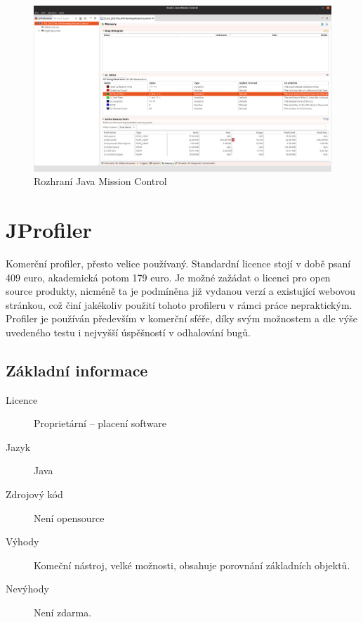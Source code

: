 \begin{figure}[ht!]
	\centering
	\includegraphics[scale=0.3]{obrazky/jmc.png}
	\caption{Rozhraní Java Mission Control}
	\label{obr-jmc}
\end{figure}

\section{JProfiler}
Komerční profiler, přesto velice používaný. Standardní licence stojí v době psaní 409 euro, akademická potom 179 euro. Je možné zažádat o licenci pro open source produkty, nicméně ta je podmíněna již vydanou verzí a existující webovou stránkou, což činí jakékoliv použití tohoto profileru v rámci práce nepraktickým. Profiler je používán především v komerční sféře, díky svým možnostem a dle výše uvedeného testu i nejvyšší úspěšností v odhalování bugů.

\clearpage
\subsection{Základní informace}

\begin{description}
    \item[Licence] Proprietární -- placení software
    \item[Jazyk] Java
    \item[Zdrojový kód] Není opensource
    \item[Výhody] Komeční nástroj, velké možnosti, obsahuje porovnání základních objektů.
    \item[Nevýhody] Není zdarma.
\end{description}

